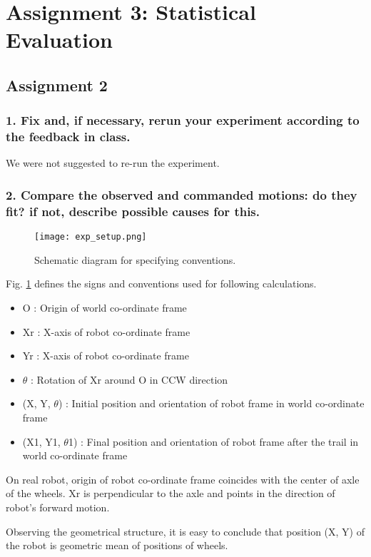 \section*{Assignment 3: Statistical Evaluation}
\subsection*{Assignment 2}
\subsubsection*{1. Fix and, if necessary, rerun your experiment according to the feedback in class.}
We were not suggested to re-run the experiment.

\subsubsection*{2. Compare the observed and commanded motions: do they fit? if not, describe possible causes for this.} 

\begin{figure}[H]
\centering
\texttt{[image: exp\_setup.png]}
\caption{Schematic diagram for specifying conventions.}
\label{schematic-convention}
\end{figure}

Fig. \ref{schematic-convention} defines the signs and conventions used for following calculations. 
\begin{itemize}
	\item O : Origin of world co-ordinate frame
	\item Xr : X-axis of robot co-ordinate frame 
	\item Yr : X-axis of robot co-ordinate frame
	\item $\theta$ : Rotation of Xr around O in CCW direction
	\item (X, Y, $\theta$) :  Initial position and orientation of robot frame in world co-ordinate frame
	\item (X1, Y1, $\theta$1) : Final position and orientation of robot frame after the trail in world co-ordinate frame
\end{itemize}



\par On real robot, origin of robot co-ordinate frame coincides with the center of axle of the wheels. Xr is perpendicular to the axle and points in the direction of robot's forward motion. \newline
\par Observing the geometrical structure, it is easy to conclude that position (X, Y) of the robot is geometric mean of positions of wheels. 

